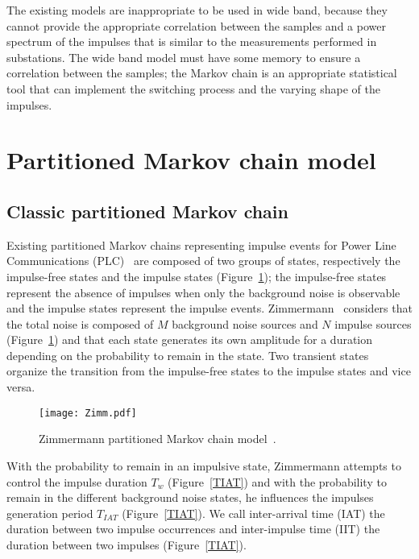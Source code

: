 \documentclass[journal]{IEEEtran}
\begin{document}
The existing models are inappropriate to be used in wide band, because they cannot provide the appropriate correlation between the samples and a power spectrum of the impulses that is similar to the measurements performed in substations. The wide band model must have some memory to ensure a correlation between the samples; the Markov chain is an appropriate statistical tool that can implement the switching process and the varying shape of the impulses.
\section{Partitioned Markov chain model}

\subsection{Classic partitioned Markov chain}
Existing partitioned Markov chains representing impulse events for Power Line Communications (PLC)~\cite{zimmermann} are composed of two groups of states, respectively the impulse-free states and the impulse states (Figure~\ref{zimm}); the impulse-free states represent the absence of impulses when only the background noise is observable and the impulse states represent the impulse events. Zimmermann~\cite{zimmermann} considers that the total noise is composed of $M$ background noise sources and $N$ impulse sources (Figure~\ref{zimm}) and that each state generates its own amplitude for a duration depending on the probability to remain in the state. Two transient states organize the transition from the impulse-free states to the impulse states and vice versa.\\
\begin{figure}[h]
\begin{center}
  \texttt{[image: Zimm.pdf]}\\
\end{center}
  \caption{Zimmermann partitioned Markov chain model~\cite{zimmermann}.}\label{zimm}
\end{figure}
With the probability to remain in an impulsive state, Zimmermann attempts to control the impulse duration $T_w$ (Figure~\ref{TIAT}) and with the probability to remain in the different background noise states, he influences the impulses generation period $T_{IAT}$ (Figure~\ref{TIAT}). We call inter-arrival time (IAT) the duration between two impulse occurrences and inter-impulse time (IIT) the duration between two impulses (Figure~\ref{TIAT}).\
\end{document}
